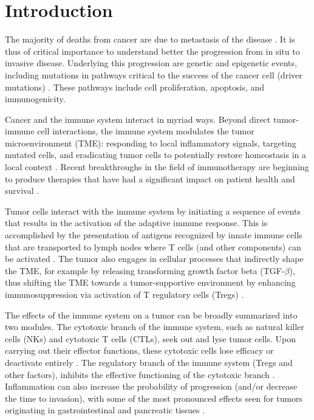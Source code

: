 \documentclass[11pt]{article}
\begin{document}
\section{Introduction}
The majority of deaths from cancer are due to metastasis of the disease \cite{dillekas}. It is thus of critical importance to understand better the progression from in situ to invasive disease. Underlying this progression are genetic and epigenetic events, including mutations in pathways critical to the success of the cancer cell (driver mutations) \cite{ryan2016hallmarks}. These pathways include cell proliferation, apoptosis, and immunogenicity.
\par 
Cancer and the immune system interact in myriad ways. Beyond direct tumor-immune cell interactions, the immune system modulates the tumor microenvironment (TME): responding to local inflammatory signals, targeting mutated cells, and eradicating tumor cells to potentially restore homeostasis in a local context \cite{de2006paradoxical}.
Recent breakthroughs in the field of immunotherapy are beginning to produce therapies that have had a significant impact on patient health and survival \cite{pardoll2012blockade,restifo2012adoptive}.
\par 
Tumor cells interact with the immune system by initiating a sequence of events that results in the activation of the adaptive immune response. This is accomplished by the presentation of antigens recognized by innate immune cells that are transported to lymph nodes where T cells (and other components) can be activated \cite{schreiber11_cancer}. The tumor also engages in cellular processes that indirectly shape the TME, for example by releasing transforming growth factor beta (TGF-$\beta$), thus shifting the TME towards a tumor-supportive environment by enhancing immunosuppression via activation of T regulatory cells (Tregs) \cite{schreiber11_cancer}.
\par
The effects of the immune system on a tumor can be broadly summarized into two modules. The cytotoxic branch of the immune system, such as natural killer cells (NKs) and cytotoxic T cells (CTLs), seek out and lyse tumor cells.
Upon carrying out their effector functions, these cytotoxic cells lose efficacy or deactivate entirely \cite{finn12_immunooncology-1}.
The regulatory branch of the immune system (Tregs and other factors), inhibits the effective functioning of the cytotoxic branch \cite{ruffell2010lymphocytes}.
Inflammation can also increase the probability of progression (and/or decrease the time to invasion), with some of the most pronounced effects seen for tumors originating in gastrointestinal and pancreatic tissues \cite{hu10_inflammationinduced, balkwill01_inflammation}.
\end{document}
